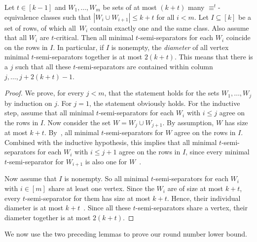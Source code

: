 \documentclass[a4paper,english, thm-restate]{lipics-v2021}
\newcommand{\defining}[1]{\emph{#1}}
\newcommand{\comp}{\equiv}
\begin{document}
\begin{lemma}
	\label{lem:separator-move-when-some-are-fixed}
	Let $t\in [k-1]$ and $W_1, \dots, W_m$ be sets of at most $(k+t)$ many $\comp^t$-equivalence classes
	such that $|W_i\cup W_{i+1}| \leq k+t$ for all $i < m$.
	Let $I\subseteq [k]$ be a set of rows,
	of which all~$W_i$ contain exactly one and the same class.
	Also assume that all $W_i$ are $t$-critical.    
	Then all minimal $t$-semi-separators for each $W_i$
	coincide on the rows in $I$.
	In particular,  if $I$ is nonempty, the \defining{diameter} of all vertex minimal $t$-semi-separators together
	is at most $2(k+t)$.
	This means that there is a $j$ such that
	all these $t$-semi-separators 
	are contained within column $j, \dots, j + 2(k+t)-1$.
\end{lemma}
\begin{proof}
	We prove, for every $j < m$, that the statement holds for the sets $W_1,\dots,W_j$ by induction on $j$.
	For $j = 1$, the statement obviously holds.
	For the inductive step,
	assume that all minimal $t$-semi-separators for each $W_i$ with $i \leq j$ agree on the rows in $I$.
	Now consider the set $W = W_j \cup W_{j+1}$.
	By assumption, $W$ has size at most $k+t$.
	By~\cite[Proposition 4.9]{RFJN024},
	all minimal $t$-semi-separators for $W$ agree on the rows in $I$. 
	Combined with the inductive hypothesis,
	this implies that all minimal $t$-semi-separators for each $W_i$ with $i \leq j+1$
	agree on the rows in $I$,
	since every minimal $t$-semi-separator for $W_{i+1}$
	is also one for $W$~\cite{RFJN024}.
	
	Now assume that $I$ is nonempty.
	So all minimal $t$-semi-separators for each $W_i$ with $i \in [m]$
	share at least one vertex. 
	Since the $W_i$ are of size at most $k+t$,
	every $t$-semi-separator for them has size at most $k+t$.
	Hence, their individual diameter is at most $k+t$~\cite{RFJN024}.
	Since all these $t$-semi-separators share a vertex,
	their diameter together is at most $2(k+t)$.
\end{proof}

\noindent We now use the two preceding lemmas to prove our round number lower bound.
\end{document}
